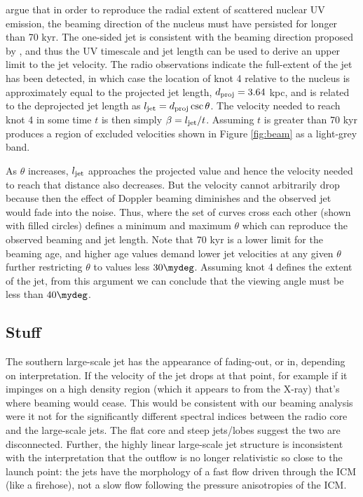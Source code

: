 \documentclass[11pt, preprint]{aastex}
\begin{document}
\citet{1999ApJ...512..145H} argue that in order to reproduce the
radial extent of scattered nuclear UV emission, the beaming direction
of the nucleus must have persisted for longer than 70 kyr. The
one-sided jet is consistent with the beaming direction proposed by
\citet{1999ApJ...512..145H}, and thus the UV timescale and jet length
can be used to derive an upper limit to the jet velocity. The radio
observations indicate the full-extent of the jet has been detected, in
which case the location of knot 4 relative to the nucleus is
approximately equal to the projected jet length, $d_{\rm{proj}} =
3.64$ kpc, and is related to the deprojected jet length as
$l_{\rm{jet}} = d_{\rm{proj}} \csc \theta$. The velocity needed to
reach knot 4 in some time $t$ is then simply $\beta =
l_{\rm{jet}}/t$. Assuming $t$ is greater than 70 kyr produces a region
of excluded velocities shown in Figure \ref{fig:beam} as a light-grey
band.



As $\theta$ increases, $l_{\rm{jet}}$ approaches the projected value
and hence the velocity needed to reach that distance also
decreases. But the velocity cannot arbitrarily drop because then the
effect of Doppler beaming diminishes and the observed jet would fade
into the noise. Thus, where the set of curves cross each other (shown
with filled circles) defines a minimum and maximum $\theta$ which can
reproduce the observed beaming and jet length. Note that 70 kyr is a
lower limit for the beaming age, and higher age values demand lower
jet velocities at any given $\theta$ further restricting $\theta$ to
values less $30\mydeg$. Assuming knot 4 defines the extent of the jet,
from this argument we can conclude that the viewing angle must be less
than $40\mydeg$.

\subsection{Stuff}
\label{sec:stuff}

The southern large-scale jet has the appearance of fading-out, or in,
depending on interpretation. If the velocity of the jet drops at that
point, for example if it impinges on a high density region (which it
appears to from the X-ray) that's where beaming would cease. This
would be consistent with our beaming analysis were it not for the
significantly different spectral indices between the radio core and
the large-scale jets. The flat core and steep jets/lobes suggest the
two are disconnected. Further, the highly linear large-scale jet
structure is inconsistent with the interpretation that the outflow is
no longer relativistic so close to the launch point: the jets have the
morphology of a fast flow driven through the ICM (like a firehose),
not a slow flow following the pressure anisotropies of the ICM.
\end{document}
